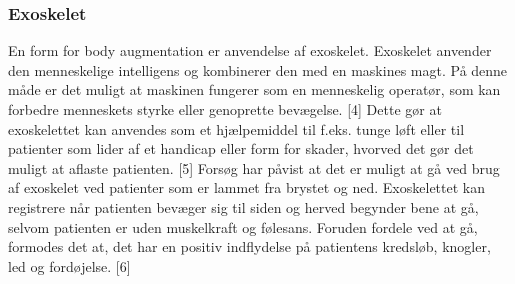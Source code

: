 \subsubsection{Exoskelet}
En form for body augmentation er anvendelse af exoskelet. Exoskelet  anvender den menneskelige intelligens og kombinerer den med en maskines magt. På denne måde er det muligt at maskinen fungerer som en menneskelig operatør, som kan forbedre menneskets styrke eller genoprette bevægelse. [4] Dette gør at exoskelettet kan anvendes som et hjælpemiddel til f.eks. tunge løft eller til patienter som lider af et handicap eller form for skader, hvorved det gør det muligt at aflaste patienten. [5] Forsøg har påvist at det er muligt at gå ved brug af exoskelet ved patienter som er lammet fra brystet og ned. Exoskelettet kan registrere når patienten bevæger sig til siden og herved begynder bene at gå, selvom patienten er uden muskelkraft og følesans. Foruden fordele ved at gå, formodes det at, det har en positiv indflydelse på patientens kredsløb, knogler, led og fordøjelse. [6]

